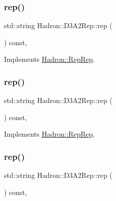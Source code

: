 \subsubsection{\texorpdfstring{rep()}{rep()}\hspace{0.1cm}{\footnotesize\ttfamily [3/5]}}
{\footnotesize\ttfamily std\+::string Hadron\+::\+D3\+A2\+Rep\+::rep (\begin{DoxyParamCaption}{ }\end{DoxyParamCaption}) const\hspace{0.3cm}{\ttfamily [inline]}, {\ttfamily [virtual]}}



Implements \mbox{\hyperlink{structHadron_1_1RepRep_ab3213025f6de249f7095892109575fde}{Hadron\+::\+Rep\+Rep}}.

\mbox{\label{structHadron_1_1D3A2Rep_a068031a95b51a3bb6b3219e51de41db2}} 
\subsubsection{\texorpdfstring{rep()}{rep()}\hspace{0.1cm}{\footnotesize\ttfamily [4/5]}}
{\footnotesize\ttfamily std\+::string Hadron\+::\+D3\+A2\+Rep\+::rep (\begin{DoxyParamCaption}{ }\end{DoxyParamCaption}) const\hspace{0.3cm}{\ttfamily [inline]}, {\ttfamily [virtual]}}



Implements \mbox{\hyperlink{structHadron_1_1RepRep_ab3213025f6de249f7095892109575fde}{Hadron\+::\+Rep\+Rep}}.

\mbox{\label{structHadron_1_1D3A2Rep_a068031a95b51a3bb6b3219e51de41db2}} 
\subsubsection{\texorpdfstring{rep()}{rep()}\hspace{0.1cm}{\footnotesize\ttfamily [5/5]}}
{\footnotesize\ttfamily std\+::string Hadron\+::\+D3\+A2\+Rep\+::rep (\begin{DoxyParamCaption}{ }\end{DoxyParamCaption}) const\hspace{0.3cm}{\ttfamily [inline]}, {\ttfamily [virtual]}}



